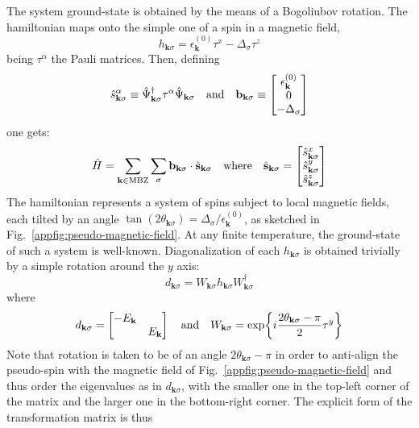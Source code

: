 The system ground-state is obtained by the means of a Bogoliubov rotation. The hamiltonian maps onto the simple one of a spin in a magnetic field,
\[
	h_{\mathbf{k}\sigma} = \epsilon_\mathbf{k}^{(0)} \tau^x - \Delta_\sigma \tau^z
\]
being $\tau^\alpha$ the Pauli matrices. Then, defining
\[
	\hat s_{\mathbf{k}\sigma}^\alpha \equiv \hat \Psi_{\mathbf{k}\sigma}^\dagger \tau^\alpha \hat \Psi_{\mathbf{k}\sigma}
	\qq{and}
	\mathbf{b}_{\mathbf{k}\sigma} \equiv \begin{bmatrix}
		\epsilon_\mathbf{k}^{(0)} \\ 0 \\ -\Delta_\sigma
	\end{bmatrix}
\]
one gets:
\begin{equation}\label{appeq:hubbard-bogoliubov-hamiltonian-pseudofields}
	\hat H = \sum_{\mathbf{k} \in \mathrm{MBZ}} \sum_\sigma \mathbf{b}_{\mathbf{k}\sigma} \cdot \hat{\mathbf{s}}_{\mathbf{k}\sigma}
	\qq{where}
	\hat{\mathbf{s}}_{\mathbf{k}\sigma} = \begin{bmatrix}
		\hat s_{\mathbf{k}\sigma}^x \\
		\hat s_{\mathbf{k}\sigma}^y \\
		\hat s_{\mathbf{k}\sigma}^z
	\end{bmatrix}
\end{equation}
The hamiltonian represents a system of spins subject to local magnetic fields, each tilted by an angle $\tan(2\theta_{\mathbf{k}\sigma}) = \Delta_\sigma/\epsilon_{\mathbf{k}}^{(0)}$, as sketched in Fig.~\ref{appfig:pseudo-magnetic-field}. At any finite temperature, the ground-state of such a system is well-known. Diagonalization of each $h_{\mathbf{k}\sigma}$ is obtained trivially by a simple rotation around the $y$ axis:
\[
	d_{\mathbf{k}\sigma} = W_{\mathbf{k}\sigma} h_{\mathbf{k}\sigma} W_{\mathbf{k}\sigma}^\dagger
\]
where
\[
	d_{\mathbf{k}\sigma} = \begin{bmatrix}
		- E_\mathbf{k} & \\
		& E_\mathbf{k}
	\end{bmatrix}
	\qq{and}
	W_{\mathbf{k}\sigma} = \exp{i \frac{2\theta_{\mathbf{k}\sigma} - \pi}{2}
	\tau^y}
\]
Note that rotation is taken to be of an angle $2\theta_{\mathbf{k}\sigma} - \pi$ in order to anti-align the pseudo-spin with the magnetic field of Fig.~\ref{appfig:pseudo-magnetic-field} and thus order the eigenvalues as in $d_{\mathbf{k}\sigma}$, with the smaller one in the top-left corner of the matrix and the larger one in the bottom-right corner. The explicit form of the transformation matrix is thus
